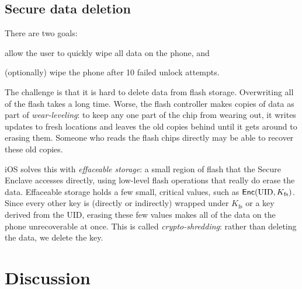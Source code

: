 \subsection{Secure data deletion}
\label{sec:ios:delete}

There are two goals:
\begin{compactitem}
  \item allow the user to quickly wipe all data on the phone, and
  \item (optionally) wipe the phone after 10 failed unlock attempts.
\end{compactitem}
The challenge is that it is hard to delete data from flash storage.
Overwriting all of the flash takes a long time.
Worse, the flash controller makes copies of data as part of
\emph{wear-leveling}: to keep any one part of the chip from wearing out,
it writes updates to fresh locations and leaves the old copies behind
until it gets around to erasing them.
Someone who reads the flash chips directly may be able to recover these
old copies.

iOS solves this with \emph{effaceable storage}: a small region of flash
that the Secure Enclave accesses directly, using low-level flash
operations that really do erase the data.
Effaceable storage holds a few small, critical values, such as
$\mathsf{Enc}(\text{UID}, K_\text{fs})$.
Since every other key is (directly or indirectly) wrapped under
$K_\text{fs}$ or a key derived from the UID, erasing these few values
makes all of the data on the phone unrecoverable at once.
This is called \emph{crypto-shredding}: rather than deleting the data, we
delete the key.

\section{Discussion}

